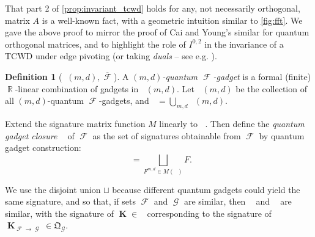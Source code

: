 \documentclass{article}
\theoremstyle{remark}
\theoremstyle{definition}
\newtheorem{definition}{Definition}[section]
\DeclareMathOperator{\rr}{\mathbb{R}}
\DeclareMathOperator{\vk}{\mathbf{K}}
\DeclareMathOperator{\fc}{\mathcal{F}}
\DeclareMathOperator{\gc}{\mathcal{G}}
\DeclareMathOperator{\gk}{\mathfrak{G}_{\mathcal{F}}}
\DeclareMathOperator{\qk}{\mathfrak{Q}_{\mathcal{F}}}
\DeclareMathOperator{\ofc}{\overline{\fc}}
\DeclareMathOperator{\ogc}{\overline{\gc}}
\begin{document}
That part 2 of \autoref{prop:invariant_tcwd} holds for any, not necessarily orthogonal, matrix $A$
is a well-known fact, with a geometric intuition similar to \autoref{fig:fft}. We gave the above
proof to mirror the proof of Cai and Young's similar \cite[Lemma 6]{cai_planar_2023} for quantum
orthogonal matrices, and to highlight the role of $I^{0,2}$ 
in the invariance of a TCWD under edge pivoting (or taking \emph{duals} --
see e.g. \cite[Appendix D]{cai_planar_2023}).

\begin{definition}[$\qk(m,d), \overline{\fc}$]
    \label{def:quantum_gadget}
    A \emph{$(m,d)$-quantum $\fc$-gadget} is a formal (finite) $\rr$-linear combination of gadgets in
    $\gk(m,d)$. Let $\qk(m,d)$ be the collection of all $(m,d)$-quantum $\fc$-gadgets,
    and $\qk = \bigcup_{m,d}\qk(m,d)$.

    Extend the signature matrix function $M$ linearly to $\qk$. Then define the \emph{quantum gadget
    closure} $\ofc$ of $\fc$ as the
    set of signatures obtainable from $\fc$ by quantum gadget construction:
    \[
        \ofc = \bigsqcup_{F^{m,d} \in M(\qk)}F.
    \]
\end{definition}
We use the disjoint union $\sqcup$ because different quantum gadgets could yield the same
signature, and so that, if sets $\fc$ and $\gc$ are similar, then $\ofc$ and
$\ogc$ are similar, with the signature of $\vk \in \qk$ corresponding to the signature of
$\vk_{\fc\to\gc} \in \mathfrak{Q}_{\gc}$.
\end{document}
